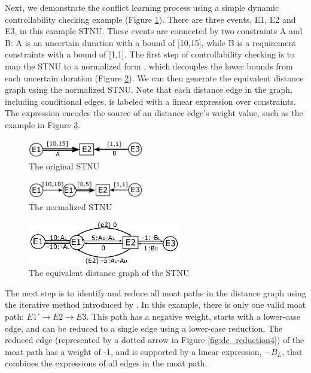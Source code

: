 \documentclass[jair,twoside,11pt,theapa]{article}
\begin{document}
Next, we demonstrate the conflict learning process using a simple dynamic
controllability checking example (Figure \ref{fig:dc_reduction1}). There are three events,
E1, E2 and E3, in this example STNU. These events are connected by two
constraints A and B: A is an uncertain duration with a bound of [10,15], while B
is a requirement constraints with a bound of [1,1]. The first step of
controllability checking is to map the STNU to a normalized form
\cite{Morris05temporaldynamic}, which decouples the lower bounds from each
uncertain duration (Figure \ref{fig:dc_reduction2}). We can then generate the
equivalent distance graph using the normalized STNU. Note that each distance
edge in the graph, including conditional edges, is labeled with a linear
expression over constraints. The expression encodes the source of an
distance edge's weight value, such as the example in Figure
\ref{fig:dc_reduction3}.


\begin{figure}[htb]
	\centering
	\includegraphics[width=0.45\textwidth]{figures/DC_reductions/dc_reduction1.pdf}
	\caption{The original STNU}
	\label{fig:dc_reduction1}
\end{figure}

\begin{figure}[htb]
	\centering
	\includegraphics[width=0.45\textwidth]{figures/DC_reductions/dc_reduction2.pdf}
	\caption{The normalized STNU}
	\label{fig:dc_reduction2}
\end{figure}

\begin{figure}[htb]
	\centering
	\includegraphics[width=0.6\textwidth]{figures/DC_reductions/dc_reduction3.pdf}
	\caption{The equivalent distance graph of the STNU}
	\label{fig:dc_reduction3}
\end{figure}

The next step is to identify and reduce all moat paths in the distance graph using the
iterative method introduced by . In this example, there
is only one valid moat path: $E1'\rightarrow E2\rightarrow E3$. This path has a
negative weight, starts with a lower-case edge, and can be reduced to a single
edge using a lower-case reduction. The reduced edge (represented by a dotted
arrow in Figure \ref{fig:dc_reduction4}) of the moat path has a weight of -1, and
is supported by a linear expression, $-B_L$, that combines the expressions of all edges
in the moat path.
\end{document}
